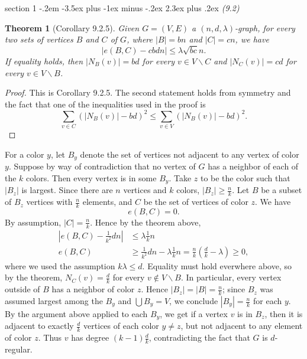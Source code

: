 \documentclass[12pt]{article}
\makeatletter
\theoremstyle{norm}
\newtheorem{thm}{Theorem}[section]
\newcommand{\nin}[0]{\not\in}
\newcommand{\rc}[1]{\frac{1}{#1}}
\newcommand{\la}[0]{\lambda}
\newcommand{\ab}[1]{\left| {#1} \right|}
\newcommand{\pa}[1]{\left( {#1} \right)}
\newcommand{\bs}[0]{\backslash}
\newenvironment{problem}{\@startsection
       {section}
       {1}
       {-.2em}
       {-3.5ex plus -1ex minus -.2ex}
       {2.3ex plus .2ex}
       {\pagebreak[3]%
       \large\bf\noindent{Problem }
       }
       }
       {%
       }
\makeatother
\begin{document}
\begin{problem}{\it (9.2)}
\begin{thm}[Corollary 9.2.5]
Given $G=(V,E)$ a $(n,d,\la)$-graph, for every two sets of vertices $B$ and $C$ of $G$, where $|B|=bn$ and $|C|=cn$, we have
\[
|e(B,C)-cbdn|\le \la\sqrt{bc}n.
\]
If equality holds, then $|N_B(v)|=bd$ for every $v\in V\bs C$ and $|N_C(v)|=cd$ for every $v\in V\bs B$.
\end{thm}
\begin{proof}
This is Corollary 9.2.5. The second statement holds from symmetry and the fact that one of the inequalities used in the proof is
\[
\sum_{v\in C}(|N_B(v)|-bd)^2\le\sum_{v\in V}(|N_B(v)|-bd)^2.
\]
\end{proof}
For a color $y$, let $B_y$ denote the set of vertices not adjacent to any vertex of color $y$. 
Suppose by way of contradiction that no vertex of $G$ has a neighbor of each of the $k$ colors. 
Then every vertex is in some $B_y$. Take $z$ to be the color such that $|B_z|$ is largest. Since there are $n$ vertices and $k$ colors, $|B_z|\ge \frac{n}{k}$. 
Let $B$ be a subset of $B_z$ vertices with $\frac{n}{k}$ elements, and $C$ be the set of vertices of color $z$. 
We have
\[e(B,C)=0.\]
By assumption, $|C|=\frac nk$. Hence by the theorem above,
\begin{align*}
\ab{e(B,C)-\rc{k^2} dn}&\le \la\rc k n\\
e(B,C)&\ge \rc{k^2}dn-\la\rc{k}n=\frac nk \pa{\frac dk-\la}\ge 0,
\end{align*}
where we used the assumption $k\la \le d$. Equality must hold everwhere above, so by the theorem, $N_C(v)=\frac dk$ for every $v\nin V\bs B$. In particular, every vertex outside of $B$ has a neighbor of color $z$. Hence $|B_z|=|B|=\frac nk$; since $B_z$ was assumed largest among the $B_y$ and $\bigcup B_y=V$, we conclude $|B_y|=\frac nk$ for each $y$. By the argument above applied to each $B_y$, we get if a vertex $v$ is in $B_z$, then it is adjacent to exactly $\frac dk$ vertices of each color $y\ne z$, but not adjacent to any element of color $z$. Thus $v$ has degree $(k-1)\frac dk$, contradicting the fact that $G$ is $d$-regular.
\end{problem}
\end{document}
